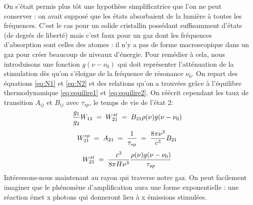 On s'était permis plus tôt une hypothèse simplificatrice que l'on ne peut conserver : on avait supposé que les états absorbaient de la lumière à toutes les fréquences. C'est le cas pour un solide cristallin possédant suffisamment d'états (de degrés de liberté) mais c'est faux pour un gaz dont les fréquences d'absorption sont celles des atomes : il n'y a pas de forme macroscopique dans un gaz pour créer beaucoup de niveaux d'énergie. Pour remédier à cela, nous introduisons une fonction $g(\nu - \nu_0)$ qui doit représenter l'atténuation de la stimulation dès qu'on s'éloigne de la fréquence de résonance $\nu_0$. On repart des équations \ref{eq:N1} et \ref{eq:N2} et des relations qu'on a trouvées grâce à l'équilibre thermodynamique \ref{eq:equilire1} et \ref{eq:equilire2}. On réécrit cependant les taux de transition $A_{ij}$ et $B_{ij}$ avec $\tau_{sp}$, le temps de vie de l'état 2:
\[
    \dfrac{g_1}{g_2}W_{12} \; = \; W_{21}^{st} \; = \; B_{21} \rho(\nu) g(\nu - \nu_0)
\]
\[
    W_{21}^{sp} \; = \; A_{21} \; = \; \dfrac{1}{\tau_{sp}} \; = \; \dfrac{8\pi \nu^3}{c^3}B_{21}
\]
\[
    W_{21}^{st} \; = \; \dfrac{c^3}{8\pi H \nu^3}\dfrac{\rho(\nu) g(\nu - \nu_0)}{\tau_{sp}}
\]
Intéressons-nous maintenant au rayon qui traverse notre gaz. On peut facilement imaginer que le phénomène d'amplification aura une forme exponentielle : une réaction émet x photons qui donneront lieu à x émissions stimulées.\\

